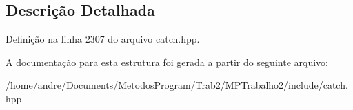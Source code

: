 \subsection{Descrição Detalhada}


Definição na linha 2307 do arquivo catch.\+hpp.



A documentação para esta estrutura foi gerada a partir do seguinte arquivo\+:\begin{DoxyCompactItemize}
\item 
/home/andre/\+Documents/\+Metodos\+Program/\+Trab2/\+M\+P\+Trabalho2/include/catch.\+hpp\end{DoxyCompactItemize}
